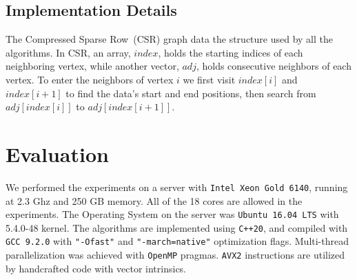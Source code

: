 \documentclass[10pt,journal,compsoc]{IEEEtran}
\begin{document}


\subsection{Implementation Details}
The Compressed Sparse Row~(CSR) graph data the structure used by all the algorithms. 
In CSR, an array, $index$, holds the starting indices of each neighboring vertex, while another vector, $adj$, holds consecutive neighbors of each vertex. 
To enter the neighbors of vertex $i$ we first visit $index[i]$ and $index[i+1]$ 
to find the data's start and end positions, then search from $adj[index[i]]$ to $adj[index[i+1]]$. 
    
\section{Evaluation}\label{sec:evaluation}
We performed the experiments on a server with {\tt Intel Xeon Gold 6140}, running at 2.3 Ghz and 250 GB memory. All of the 18 cores are allowed in the experiments. The Operating System on the server was {\tt Ubuntu 16.04 LTS} with 5.4.0-48 kernel. The algorithms are implemented using {\tt C++20}, and compiled with {\tt GCC 9.2.0} with {\tt "-Ofast"} and {\tt "-march=native"} optimization flags. Multi-thread parallelization was achieved with {\tt OpenMP} pragmas. {\tt AVX2} instructions are utilized by handcrafted code with vector intrinsics.
\end{document}
